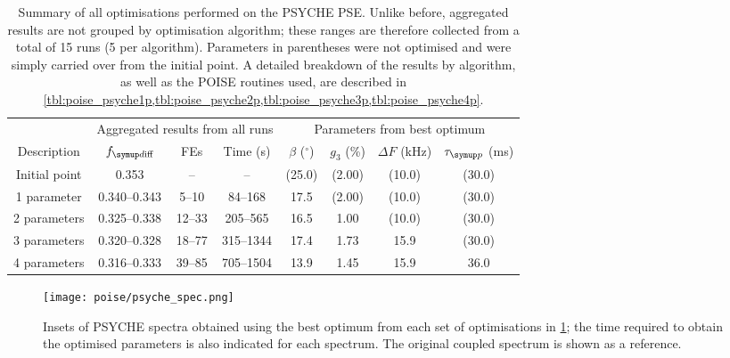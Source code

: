 \begin{table}
    \centering
    \begin{tabular}{cccccccc}
        \toprule
         & \multicolumn{3}{c}{Aggregated results from all runs} & \multicolumn{4}{c}{Parameters from best optimum} \\
        \cmidrule(lr){2-4} \cmidrule(lr){5-8}
        Description & $\fdiff$ & FEs              & Time (\unit{\s}) & $\beta$ ($^\circ$) & $g_3$ (\%) & $\Delta F$ (kHz) & $\taup$ (ms) \\
        \midrule
        Initial point & 0.353        & --     & --        & (25.0) & (2.00) & (10.0) & (30.0) \\
        1 parameter   & 0.340--0.343 & 5--10  & 84--168   & 17.5   & (2.00) & (10.0) & (30.0) \\
        2 parameters  & 0.325--0.338 & 12--33 & 205--565  & 16.5   & 1.00   & (10.0) & (30.0) \\
        3 parameters  & 0.320--0.328 & 18--77 & 315--1344 & 17.4   & 1.73   & 15.9   & (30.0) \\
        4 parameters  & 0.316--0.333 & 39--85 & 705--1504 & 13.9   & 1.45   & 15.9   & 36.0   \\
        \bottomrule
    \end{tabular}
    \caption[Overview of all PSYCHE optimisations]{
        Summary of all optimisations performed on the PSYCHE PSE.
        Unlike before, aggregated results are not grouped by optimisation algorithm; these ranges are therefore collected from a total of 15 runs (5 per algorithm).
        Parameters in parentheses were not optimised and were simply carried over from the initial point.
        A detailed breakdown of the results by algorithm, as well as the POISE routines used, are described in \cref{tbl:poise_psyche1p,tbl:poise_psyche2p,tbl:poise_psyche3p,tbl:poise_psyche4p}.
    }
    \label{tbl:poise_psyche_summary}
\end{table}

\begin{figure}[htb]
    \centering
    \texttt{[image: poise/psyche\_spec.png]}%
    \caption[PSYCHE spectra before and after optimisation]{
        Insets of PSYCHE spectra obtained using the best optimum from each set of optimisations in \cref{tbl:poise_psyche_summary}; the time required to obtain the optimised parameters is also indicated for each spectrum.
        The original coupled \proton{} spectrum is shown as a reference.
    }
    \label{fig:poise_psyche_spec}
\end{figure}

